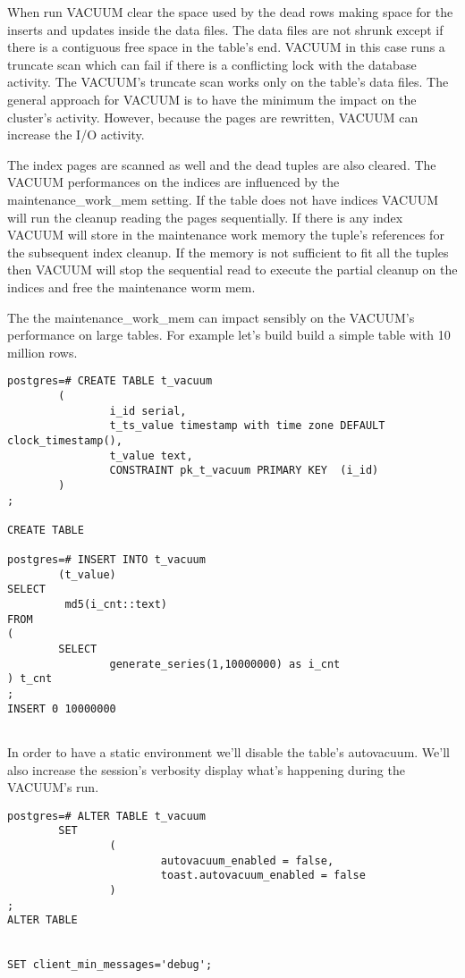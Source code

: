 When run VACUUM clear the space used by the dead rows making space for the inserts and updates inside the 
data files. The data files are not shrunk except if there is a contiguous free space in the table's 
end. VACUUM in this case runs a truncate scan which can fail if there is a conflicting lock with the 
database activity. The VACUUM's truncate scan works only on the table's data files. The general approach 
for VACUUM is to have the minimum the impact on the cluster's activity. However, because the pages are 
rewritten, VACUUM can increase the I/O activity.\newline

The index pages are scanned as well and the dead tuples are also cleared. The VACUUM performances on the 
indices are influenced by the maintenance\_work\_mem setting. If the table does not have indices VACUUM 
will run the cleanup reading the pages sequentially. If there is any index VACUUM will store in the 
maintenance work memory  the tuple's references for the subsequent index cleanup. If the memory is 
not sufficient to fit all the tuples then VACUUM will stop the sequential read to execute the 
partial cleanup on the indices and free the maintenance worm mem.\newline

The the maintenance\_work\_mem  can impact sensibly on the VACUUM's performance on large tables. For example 
let's build build a simple table with 10 million rows. 


\begin{lstlisting}[style=pgsql]
postgres=# CREATE TABLE t_vacuum 
        (
                i_id serial,
                t_ts_value timestamp with time zone DEFAULT clock_timestamp(),
                t_value text,
                CONSTRAINT pk_t_vacuum PRIMARY KEY  (i_id)
        )
;

CREATE TABLE

postgres=# INSERT INTO t_vacuum
        (t_value)
SELECT 
         md5(i_cnt::text)
FROM
(
        SELECT
                generate_series(1,10000000) as i_cnt
) t_cnt
;
INSERT 0 10000000


\end{lstlisting}
In order to have a static environment we'll disable the table's autovacuum. We'll also increase the 
session's verbosity display what's happening during the VACUUM's run.\newline

\begin{lstlisting}[style=pgsql]
postgres=# ALTER TABLE t_vacuum 
        SET 
                (
                        autovacuum_enabled = false, 
                        toast.autovacuum_enabled = false
                )
;
ALTER TABLE


SET client_min_messages='debug';

\end{lstlisting}

